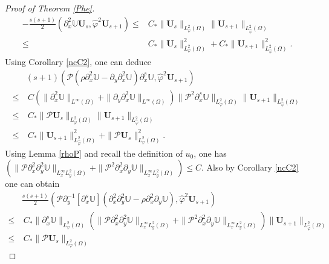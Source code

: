 \documentclass[10pt,a4paper]{amsart}
\begin{document}
\begin{proof}[Proof of Theorem \ref{Phe}]
\begin{align}\label{J61}
-\frac{s(s+1)}{2}\left(\partial_{x}^{2}\mathbb{U}\mathbf{U}_{s},\hat{\varphi}^{2}\mathbf{U}_{s+1}\right)
\leq& C_{*}\|\mathbf{U}_{s}\|_{L_{\varphi}^{2}(\Omega)}\|\mathbf{U}_{s+1}\|_{L_{\hat{\varphi}}^{2}(\Omega)}\\
\leq& C_{*}\|\mathbf{U}_{s}\|_{L_{\varphi}^{2}(\Omega)}^{2}
     +C_{*}\|\mathbf{U}_{s+1}\|_{L_{\hat{\varphi}}^{2}(\Omega)}^{2}.\nonumber
\end{align}
Using Corollary \ref{ncC2}, one can deduce
\begin{align}\label{J62}
&(s+1)\left(\mathcal{P}\left(\rho\partial_{x}^{2}\mathbb{U}-\partial_{y}\partial_{x}^{2}\mathbb{U}\right)\partial_{x}^{s}\mathbb{U},\hat{\varphi}^{2}\mathbf{U}_{s+1}\right)\\
\leq&~C(\|\partial_{x}^{2}\mathbb{U}\|_{L^{\infty}(\Omega)}+\|\partial_{y}\partial_{x}^{2}\mathbb{U}\|_{L^{\infty}(\Omega)})
      \|\mathcal{P}^{2}\partial_{x}^{s}\mathbb{U}\|_{L_{\varphi}^{2}(\Omega)}
      \|\mathbf{U}_{s+1}\|_{L_{\hat{\varphi}}^{2}(\Omega)}\nonumber\\
\leq&~C_{*}\|\mathcal{P}\mathbf{U}_{s}\|_{L_{\varphi}^{2}(\Omega)}
      \|\mathbf{U}_{s+1}\|_{L_{\hat{\varphi}}^{2}(\Omega)}\nonumber\\
\leq&~C_{*}\|\mathbf{U}_{s+1}\|_{L_{\hat{\varphi}}^{2}(\Omega)}^{2}
     +\|\mathcal{P}\mathbf{U}_{s}\|_{L_{\varphi}^{2}(\Omega)}^{2}.\nonumber
\end{align}
Using Lemma \ref{rhoP} and recall the definition of $u_{0}$, one has
$\left(\|\mathcal{P}\partial_{x}^{2}\partial_{y}^{2}\mathbb{U}\|_{L_{x}^{\infty}L_{y}^{2}(\Omega)}
 +\|\mathcal{P}^{2}\partial_{x}^{2}\partial_{y}\mathbb{U}\|_{L_{x}^{\infty}L_{y}^{2}(\Omega)}\right)\leq C$.
Also by Corollary \ref{ncC2} one can obtain
\begin{align}\label{J63}
&\frac{s(s+1)}{2}\left(\mathcal{P}\partial_{y}^{-1}[\partial_{x}^{s}\mathbb{U}](\partial_{x}^{2}\partial_{y}^{2}\mathbb{U}-\rho\partial_{x}^{2}\partial_{y}\mathbb{U}),\hat{\varphi}^{2}\mathbf{U}_{s+1}\right)\\
\leq&~C_{*}\|\partial_{x}^{s}\mathbb{U}\|_{L_{\varphi}^{2}(\Omega)}
       \left(\|\mathcal{P}\partial_{x}^{2}\partial_{y}^{2}\mathbb{U}\|_{L_{x}^{\infty}L_{y}^{2}(\Omega)}+\|\mathcal{P}^{2}\partial_{x}^{2}\partial_{y}\mathbb{U}\|_{L_{x}^{\infty}L_{y}^{2}(\Omega)}\right)
       \|\mathbf{U}_{s+1}\|_{L_{\hat{\varphi}}^{2}(\Omega)}\nonumber\\
\leq&~C_{*}\|\mathcal{P}\mathbf{U}_{s}\|_{L_{\varphi}^{2}(\Omega)}

\end{align}
\end{proof}
\end{document}
